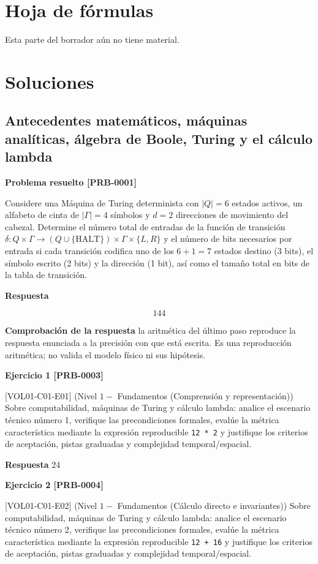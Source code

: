 \documentclass{book}
\begin{document}
\chapter{Hoja de fórmulas}

\noindent Esta parte del borrador aún no tiene material.
\chapter{Soluciones}

\section{Antecedentes matemáticos, máquinas analíticas, álgebra de Boole, Turing y el cálculo lambda}

\noindent\textbf{Problema resuelto [PRB-0001]}

Considere una Máquina de Turing determinista con \(|Q| = 6\) estados activos, un alfabeto de cinta de \(|\Gamma| = 4\) símbolos y \(d = 2\) direcciones de movimiento del cabezal. Determine el número total de entradas de la función de transición \(\delta: Q \times \Gamma \to (Q \cup \{\text{HALT}\}) \times \Gamma \times \{L, R\}\) y el número de bits necesarios por entrada si cada transición codifica uno de los \(6 + 1 = 7\) estados destino (3 bits), el símbolo escrito (2 bits) y la dirección (1 bit), así como el tamaño total en bits de la tabla de transición.

\noindent\textbf{Respuesta}

\[
144
\]

\noindent\textbf{Comprobación de la respuesta} la aritmética del último paso reproduce la respuesta enunciada a la precisión con que está escrita. Es una reproducción aritmética; no valida el modelo físico ni sus hipótesis.

\noindent\textbf{Ejercicio 1 [PRB-0003]}

[VOL01-C01-E01] (Nivel \(1 -\) Fundamentos (Comprensión y representación)) Sobre computabilidad, máquinas de Turing y cálculo lambda: analice el escenario técnico número 1, verifique las precondiciones formales, evalúe la métrica característica mediante la expresión reproducible \texttt{12 * 2} y justifique los criterios de aceptación, pistas graduadas y complejidad temporal/espacial.

\noindent\textbf{Respuesta} 24

\noindent\textbf{Ejercicio 2 [PRB-0004]}

[VOL01-C01-E02] (Nivel \(1 -\) Fundamentos (Cálculo directo e invariantes)) Sobre computabilidad, máquinas de Turing y cálculo lambda: analice el escenario técnico número 2, verifique las precondiciones formales, evalúe la métrica característica mediante la expresión reproducible \texttt{12 + 16} y justifique los criterios de aceptación, pistas graduadas y complejidad temporal/espacial.
\end{document}
